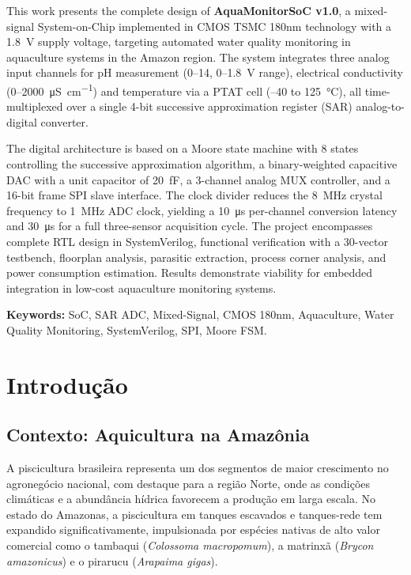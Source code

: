 \documentclass[12pt,a4paper]{article}
\begin{document}
This work presents the complete design of \textbf{AquaMonitorSoC v1.0}, a
mixed-signal System-on-Chip implemented in CMOS TSMC 180nm technology with a
\SI{1.8}{\volt} supply voltage, targeting automated water quality monitoring in
aquaculture systems in the Amazon region. The system integrates three analog
input channels for pH measurement (0--14, 0--\SI{1.8}{\volt} range), electrical
conductivity (0--\SI{2000}{\micro\siemens\per\centi\meter}) and temperature via
a PTAT cell (--40 to \SI{125}{\celsius}), all time-multiplexed over a single
4-bit successive approximation register (SAR) analog-to-digital converter.

The digital architecture is based on a Moore state machine with 8 states
controlling the successive approximation algorithm, a binary-weighted capacitive
DAC with a unit capacitor of \SI{20}{\femto\farad}, a 3-channel analog MUX
controller, and a 16-bit frame SPI slave interface. The clock divider reduces the
\SI{8}{\mega\hertz} crystal frequency to \SI{1}{\mega\hertz} ADC clock, yielding
a \SI{10}{\micro\second} per-channel conversion latency and \SI{30}{\micro\second}
for a full three-sensor acquisition cycle. The project encompasses complete RTL
design in SystemVerilog, functional verification with a 30-vector testbench,
floorplan analysis, parasitic extraction, process corner analysis, and power
consumption estimation. Results demonstrate viability for embedded integration
in low-cost aquaculture monitoring systems.

\textbf{Keywords:} SoC, SAR ADC, Mixed-Signal, CMOS 180nm, Aquaculture,
Water Quality Monitoring, SystemVerilog, SPI, Moore FSM.

\newpage

\section{Introdução}
\label{sec:intro}

\subsection{Contexto: Aquicultura na Amazônia}

A piscicultura brasileira representa um dos segmentos de maior crescimento no
agronegócio nacional, com destaque para a região Norte, onde as condições
climáticas e a abundância hídrica favorecem a produção em larga escala. No
estado do Amazonas, a piscicultura em tanques escavados e tanques-rede tem
expandido significativamente, impulsionada por espécies nativas de alto valor
comercial como o tambaqui (\textit{Colossoma macropomum}), a matrinxã
(\textit{Brycon amazonicus}) e o pirarucu (\textit{Arapaima gigas}).
\end{document}
